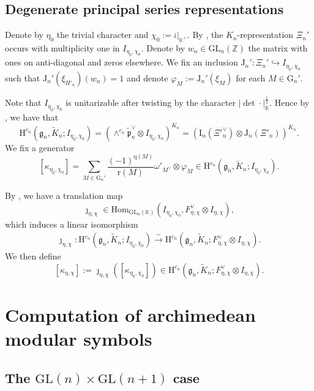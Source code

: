 \documentclass[12pt, a4paper]{amsart}
\newcommand{\RG}{{\mathrm {G}}}
\newcommand{\RH}{{\mathrm {H}}}
\newcommand{\RI}{{\mathrm {I}}}
\newcommand{\RJ}{{\mathrm {J}}}
\newcommand{\GL}{{\mathrm{GL}}}
\newcommand{\Z}{\mathbb{Z}}
\newcommand{\K}{\mathbb{K}}
\theoremstyle{Theorem}
\theoremstyle{Theorem}
\theoremstyle{Theorem}
\theoremstyle{Theorem}
\theoremstyle{Plain}
\theoremstyle{Definition}
\begin{document}
	\subsection{Degenerate principal series representations}\label{induced}
	
	Denote by $\eta_0$ the trivial character and $\chi_0:=\overline{\iota}|_{\K^{\times}}$. By \cite[Lemma 4.1]{DX}, the $K_n$-representation $\Xi_n'$ occurs with multiplicity one in $I_{\eta_0,\chi_0}$. Denote by $w_n\in\GL_n(\Z)$ the matrix with ones on anti-diagonal and zeros elsewhere. We fix an inclusion $\RJ_n':\Xi_n'\hookrightarrow I_{\eta_0,\overline{\chi}_0}$ such that $\RJ_n'(\xi_{H'_n})(w_n)=1$ and denote $\varphi_M:=\RJ_n'(\xi_{M})$ for each $M\in\RG_n'$. 
	
	Note that $I_{\eta_0,\chi_0}$ is unitarizable after twisting by the character $|\det\cdot|_{\K}^{\frac{1}{2}}$. Hence by \cite[Proposition 9.4.3]{Wa1}, we have that
	\begin{equation}\label{W2}
		\RH^{c_n}\left(\mathfrak{g}_n,\widetilde{K}_n;I_{\eta_0,\chi_0}\right)=\left(\wedge^{c_n}\widetilde{\mathfrak{p}}^{\vee}_n\otimes I_{\eta_0,\chi_0}\right)^{K_n}=\left(\RI_n(\Xi'^{\vee}_n)\otimes\RJ_n(\Xi'_n)\right)^{K_n}.
	\end{equation}
	We fix a generator
	\[
	[\kappa_{\eta_0,\chi_0}]=\sum_{M\in\RG_n'}\frac{(-1)^{\mathrm{q}(M)}}{\mathrm{r}(M)}\omega'_{M^{\vee}}\otimes\varphi_M\in\RH^{c_n}\left(\mathfrak{g}_n,\widetilde{K}_n;I_{\eta_0,\chi_0}\right).
	\]
	
	By \cite[Proposition 1.2]{JLSa}, we have a translation map
	\[
	\jmath_{\eta,\chi}\in\mathrm{Hom}_{\GL_n(\K)}(I_{\eta_0,\chi_0},F_{\eta,\chi}^{\vee}\otimes I_{\eta,\chi}),
	\]
	which induces a linear isomorphism
	\[
	\begin{aligned}
		\jmath_{\eta,\chi}:\RH^{c_n}\left(\mathfrak{g}_n,\widetilde{K}_n;I_{\eta_0,\chi_0}\right)\xrightarrow{\sim}\RH^{c_n}\left(\mathfrak{g}_n,\widetilde{K}_n;F_{\eta,\chi}^{\vee}\otimes I_{\eta,\chi}\right).
	\end{aligned}
	\]
	We then define
	\[
	[\kappa_{\eta,\chi}]:=\jmath_{\eta,\chi}([\kappa_{\eta_0,\chi_0}])\in\RH^{c_n}\left(\mathfrak{g}_n,\widetilde{K}_n;F_{\eta,\chi}^{\vee}\otimes I_{\eta,\chi}\right).
	\]
	
	\section{Computation of archimedean modular symbols}
	
	\subsection{The $\GL(n)\times\GL(n+1)$ case}
	\label{n+1}
	
\end{document}

